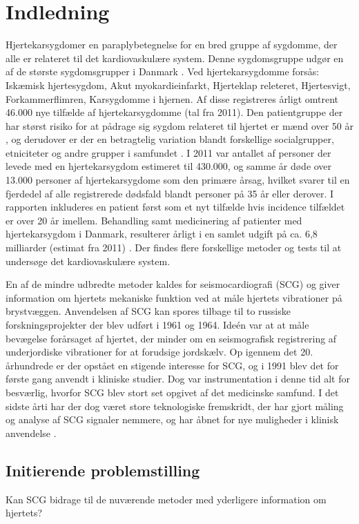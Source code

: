 \chapter{Indledning} \label{Indledning}

\textquotedbl Hjertekarsygdom\textquotedbl er en paraplybetegnelse for en bred gruppe af sygdomme, der alle er relateret til det kardiovaskulære system. Denne sygdomsgruppe udgør en af de største sygdomsgrupper i Danmark \cite{livet}. Ved hjertekarsygdomme forsås: Iskæmisk hjertesygdom, Akut myokardieinfarkt, Hjerteklap releteret, Hjertesvigt, Forkammerflimren, Karsygdomme i hjernen\cite{2011}. Af disse registreres årligt omtrent 46.000 nye tilfælde af hjertekarsygdomme (tal fra 2011). Den patientgruppe der har størst risiko for at pådrage sig sygdom relateret til hjertet er mænd over 50 år \cite{2011}, og derudover er der en betragtelig variation blandt forskellige socialgrupper, etniciteter og andre grupper i samfundet \cite{hjerteforening}. I 2011 var antallet af personer der levede med en hjertekarsygdom estimeret til 430.000, og samme år døde over 13.000 personer af hjertekarsygdome som den primære årsag, hvilket svarer til en fjerdedel af alle registrerede dødsfald blandt personer på 35 år eller derover. I rapporten inkluderes en patient først som et nyt tilfælde hvis incidence tilfældet er over 20 år imellem.\cite{2011} Behandling samt medicinering af patienter med hjertekarsygdom i Danmark, resulterer årligt i en samlet udgift på ca. 6,8 milliarder (estimat fra 2011) \cite{hjerteforening}. Der findes flere forskellige metoder og tests til at undersøge det kardiovaskulære system.


 En af de mindre udbredte metoder kaldes for seismocardiografi (SCG) og giver information om hjertets mekaniske funktion ved at måle hjertets vibrationer på brystvæggen. Anvendelsen af SCG kan spores tilbage til to russiske forskningsprojekter der blev udført  i 1961 og 1964. Ideén var at at måle bevægelse forårsaget af hjertet, der minder om en seismografisk registrering af underjordiske vibrationer for at forudsige jordskælv. Op igennem det 20. århundrede er der opstået en stigende interesse for SCG, og i 1991 blev det for første gang anvendt i kliniske studier. Dog var instrumentation i denne tid alt for besværlig, hvorfor SCG blev stort set opgivet af det medicinske samfund. I det sidste årti har der dog været store teknologiske fremskridt, der har gjort måling og analyse af SCG signaler nemmere, og har åbnet for nye muligheder i klinisk anvendelse \cite{onan} \cite{zanetti}.

\section{Initierende problemstilling} Kan SCG bidrage til de nuværende metoder med yderligere information om hjertets?